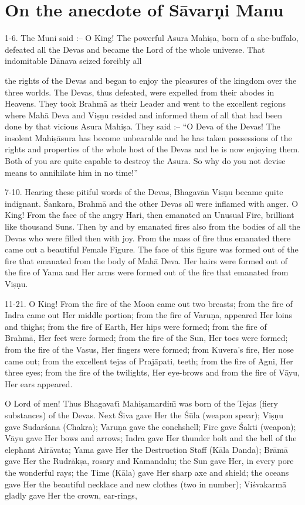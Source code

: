 \chapter{On the anecdote of S\=avar\d{n}i Manu}

1-6. The Muni said :-- O King! The powerful Asura Mahi\d{s}a, born of a she-buffalo, defeated all the Devas and became the Lord of the whole universe. That indomitable D\=anava seized forcibly all

the rights of the Devas and began to enjoy the pleasures of the kingdom over the three worlds. The Devas, thus defeated, were expelled from their abodes in Heavens. They took Brahm\=a as their Leader and went to the excellent regions where Mah\=a Deva and Vi\d{s}\d{n}u resided and informed them of all that had been done by that vicious Asura Mahi\d{s}a. They said :-- ``O Deva of the Devas! The insolent Mahi\d{s}\=asura has become unbearable and he has taken possessions of the rights and properties of the whole host of the Devas and he is now enjoying them. Both of you are quite capable to destroy the Asura. So why do you not devise means to annihilate him in no time!''

7-10. Hearing these pitiful words of the Devas, Bhagav\=an Vi\d{s}\d{n}u became quite indignant. \'Sankara, Brahm\=a and the other Devas all were inflamed with anger. O King! From the face of the angry Hari, then emanated an Unusual Fire, brilliant like thousand Suns. Then by and by emanated fires also from the bodies of all the Devas who were filled then with joy. From the mass of fire thus emanated there came out a beautiful Female Figure. The face of this figure was formed out of the fire that emanated from the body of Mah\=a Deva. Her hairs were formed out of the fire of Yama and Her arms were formed out of the fire that emanated from Vi\d{s}\d{n}u.

11-21. O King! From the fire of the Moon came out two breasts; from the fire of Indra came out Her middle portion; from the fire of Varu\d{n}a, appeared Her loins and thighs; from the fire of Earth, Her hips were formed; from the fire of Brahm\=a, Her feet were formed; from the fire of the Sun, Her toes were formed; from the fire of the Vasus, Her fingers were formed; from Kuvera's fire, Her nose came out; from the excellent tejas of Praj\=apati, teeth; from the fire of Agni, Her three eyes; from the fire of the twilights, Her eye-brows and from the fire of V\=ayu, Her ears appeared.

O Lord of men! Thus Bhagavat\={\i} Mahi\d{s}amardin\={\i} was born of the Tejas (fiery substances) of the Devas. Next \'Siva gave Her the \'S\=ula (weapon spear); Vi\d{s}\d{n}u gave Sudar\'sana (Chakra); Varu\d{n}a gave the conchshell; Fire gave \'Sakti (weapon); V\=ayu gave Her bows and arrows; Indra gave Her thunder bolt and the bell of the elephant Air\=avata; Yama gave Her the Destruction Staff (K\=ala Danda); Br\=am\=a gave Her the Rudr\=ak\d{s}a, rosary and Kamandalu; the Sun gave Her, in every pore the wonderful rays; the Time (K\=ala) gave Her sharp axe and shield; the oceans gave Her the beautiful necklace and new clothes (two in number); Vi\'svakarm\=a gladly gave Her the crown, ear-rings,

